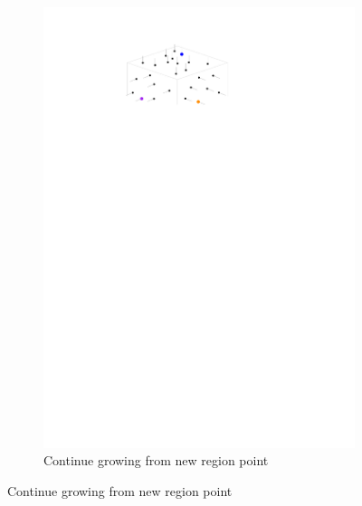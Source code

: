 \begin{figure}[htb]
\begin{subfigure}[b]{0.3\linewidth}
		\includegraphics[width=\textwidth,page=3]{figs/region-growing.pdf}
		\caption{Continue growing from new region point}
		\label{fig:region-growing:c}
	\end{subfigure}
	

\end{figure}
